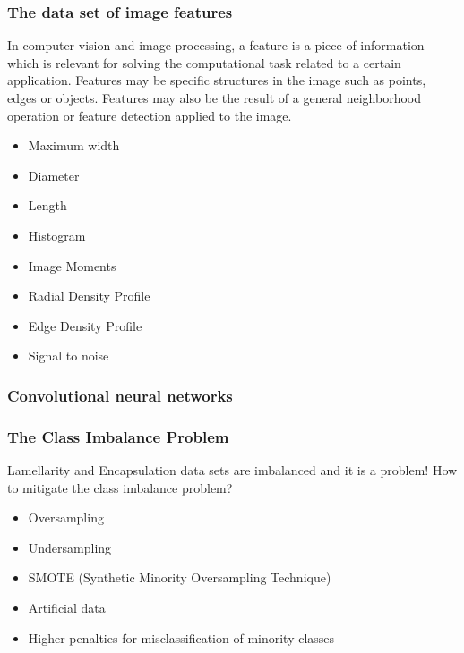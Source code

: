 \documentclass{beamer}
\begin{document}
\begin{frame}
\frametitle{The data set of image features}

\begin{definition}
In computer vision and image processing, a feature is a piece of information which is relevant for solving the computational task related to a certain application. Features may be specific structures in the image such as points, edges or objects. Features may also be the result of a general neighborhood operation or feature detection applied to the image.
\end{definition}

\begin{itemize}
\item Maximum width
\item Diameter
\item Length
\item Histogram
\item Image Moments 
\item Radial Density Profile
\item Edge Density Profile
\item Signal to noise
\end{itemize}

\end{frame}

%
%

\begin{frame}
\frametitle{Convolutional neural networks}
\begin{definition}

\end{definition}
\end{frame}

%
%

\begin{frame}
\frametitle{The Class Imbalance Problem}

Lamellarity and Encapsulation data sets are imbalanced and it is a problem!
\vskip 0.2in
How to mitigate the class imbalance problem?
\begin{itemize}
\item Oversampling
\item Undersampling
\item SMOTE (Synthetic Minority Oversampling Technique)
\item Artificial data
\item Higher penalties for misclassification of minority classes
\end{itemize}


\end{frame}
\end{document}
